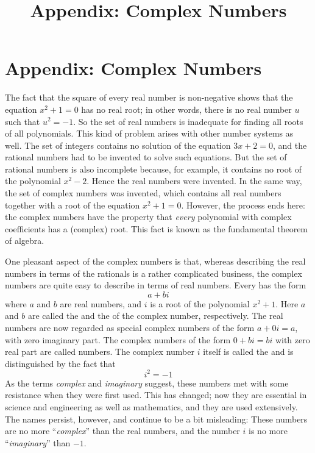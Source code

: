 \documentclass{ximera}
\title{Appendix: Complex Numbers} \license{CC BY-SA-NC 4.0}
\begin{document}
\begin{abstract}
\end{abstract}
\maketitle

\section*{Appendix: Complex Numbers}
The fact that the square of every real number is non-negative shows that the equation $x^{2} + 1 = 0$ has no real root; in other words, there is no real number $u$ such that $u^{2} = -1$. So the set of real numbers is inadequate for finding all roots of all polynomials. This kind of problem arises with other number systems as well. The set of integers contains no solution of the equation $3x + 2 = 0$, and the rational numbers had to be invented to solve such
equations. But the set of rational numbers is also incomplete because,
for example, it contains no root of the polynomial $x^{2} - 2$. Hence the real numbers were invented. In the same way, the set of
complex numbers was invented, which contains all real numbers together
with a root of the equation $x^{2} + 1 = 0$. However, the process ends here: the complex numbers have the property that \textit{every} polynomial with complex coefficients has a (complex) root. This fact is known as the fundamental theorem of algebra.

One pleasant aspect of the complex
numbers is that, whereas describing the real numbers in terms of the
rationals is a rather complicated business, the complex numbers are
quite easy to describe in terms of real numbers. Every  has the form
\begin{equation*}
a + bi
\end{equation*}
where $a$ and $b$ are real numbers, and $i$ is a root of the polynomial $x^{2} + 1$. Here $a$ and $b$ are called the  and the of the complex number, respectively. The real numbers are now regarded as special complex numbers of the form $a + 0i = a$, with zero imaginary part. The complex numbers of the form $0 + bi = bi$ with zero real part are called  numbers. The complex number $i$ itself is called the  and is distinguished by the fact that
\begin{equation*}
i^2 = -1
\end{equation*}
As the terms \textit{complex} and \textit{imaginary}
 suggest, these numbers met with some resistance when they were first
used. This has changed; now they are essential in science and
engineering as well as mathematics, and they are used extensively. The
names persist, however, and continue to be a bit misleading: These
numbers are no more ``\textit{complex}'' than the real numbers, and the number $i$ is no more ``\textit{imaginary}'' than $-1$.
\end{document}
